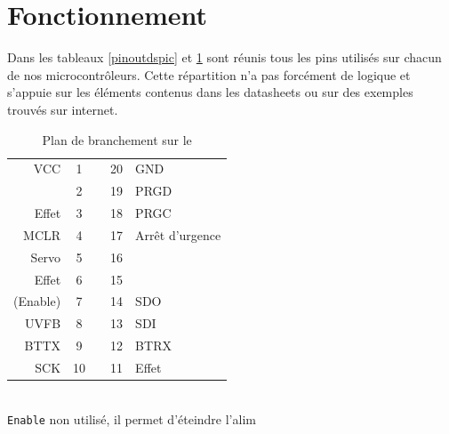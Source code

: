 		\section{Fonctionnement}
		Dans les tableaux \ref{pinoutdspic} et \ref{pinoutpic} sont réunis tous les pins utilisés sur chacun de nos microcontrôleurs. Cette répartition n'a pas forcément de logique et s'appuie sur les éléments contenus dans les datasheets ou sur des exemples trouvés sur internet.\\
		\begin{table}[h]
			\begin{multicols}{2}
			\begin{center}
			
			
			\begin{footnotesize}
			\begin{tabular}{r|ccc|l}
				VCC		& 1 &   & 20 & GND \\ 
				  		& 2 &   & 19 & PRGD \\ 
				Effet	& 3 &   & 18 & PRGC \\ 
				MCLR 	& 4 &   & 17 & Arrêt d'urgence \\ 
				Servo 	& 5 &   & 16 &   \\
				 Effet	& 6 &   & 15 &   \\ 
				(Enable)	& 7 &   & 14 & SDO \\ 
				UVFB 	& 8 &   & 13 & SDI \\ 
				BTTX 	& 9 &   & 12 & BTRX \\ 
				SCK 	& 10&   & 11 & Effet   \\ 
				\end{tabular} 
				\\ \texttt{Enable} non utilisé, il permet d'éteindre l'alim
			\end{footnotesize}
				
			
			\caption{Plan de branchement sur le \pic}
			\label{pinoutpic}
		

\end{center}
\end{multicols}
\end{table}

